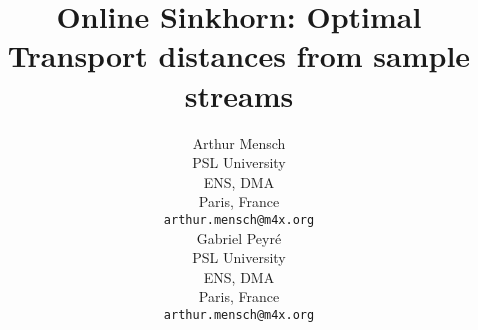 \title{Online Sinkhorn: Optimal Transport distances from sample streams}

%

\author{%
  Arthur Mensch \\
  PSL University\\
  ENS, DMA\\
  Paris, France \\
  \texttt{arthur.mensch@m4x.org} \\
  \And
  Gabriel Peyré \\
  PSL University\\
  ENS, DMA\\
  Paris, France \\
  \texttt{arthur.mensch@m4x.org} \\
}

\maketitle